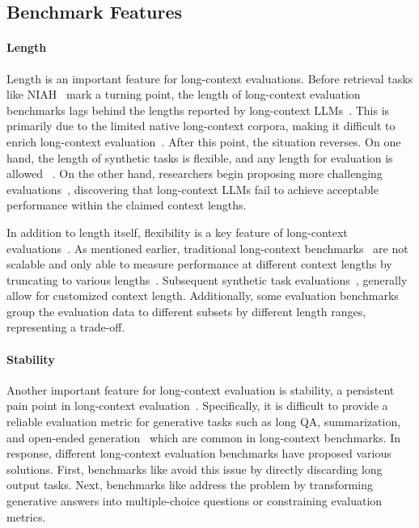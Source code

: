 \subsection{Benchmark Features}

\paragraph{Length} Length is an important feature for long-context evaluations. Before retrieval tasks like NIAH~\citep{niah,multi_niah} mark a turning point, the length of long-context evaluation benchmarks lags behind the lengths reported by long-context LLMs~\citep{pengyarn,young2024yi,cai2024internlm2}. This is primarily due to the limited native long-context corpora, making it difficult to enrich long-context evaluation~\citep{an2023eval,li2023loogle}. After this point, the situation reverses. On one hand, the length of synthetic tasks is flexible, and any length for evaluation is allowed ~\citep{liu2024reattention,lieber2024jamba}. On the other hand, researchers begin proposing more challenging evaluations~\citep{levy2024same,li2024long,hsieh2024ruler,gavin2024longins}, discovering that long-context LLMs fail to achieve acceptable performance within the claimed context lengths.

In addition to length itself, flexibility is a key feature of long-context evaluations~\citep{niah,yen2024helmet}. As mentioned earlier, traditional long-context benchmarks~\citep{an2023eval,bai2023longbench,zhang2024bench} are not scalable and only able to measure performance at different context lengths by truncating to various lengths~\citep{bai2023longbench}. Subsequent synthetic task evaluations~\citep{niah,levy2024same,hsieh2024ruler,liu2024longgenbench}, generally allow for customized context length. Additionally, some evaluation benchmarks~\citep{kwan2023m4le,lee2024can,yen2024helmet} group the evaluation data to different subsets by different length ranges, representing a trade-off.

\paragraph{Stability} Another important feature for long-context evaluation is stability, a persistent pain point in long-context evaluation~\citep{novikova2017we,an2023eval,yen2024helmet}. Specifically, it is difficult to provide a reliable evaluation metric for generative tasks such as long QA, summarization, and open-ended generation~\citep{an2023eval,novikova2017we} which are common in long-context benchmarks. In response, different long-context evaluation benchmarks have proposed various solutions. First, benchmarks like \citet{dong2024bamboo} avoid this issue by directly discarding long output tasks. Next, benchmarks like \citet{zhang2023marathon,lee2024can,bai2024longbench} address the problem by transforming generative answers into multiple-choice questions or constraining evaluation metrics.


